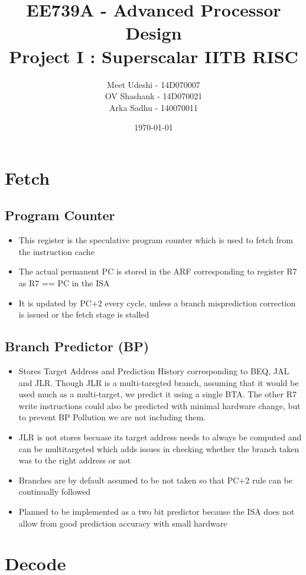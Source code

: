 \documentclass{article}
\title{EE739A - Advanced Processor Design\\
  Project I : Superscalar IITB RISC
}
\author{Meet Udeshi - 14D070007\\
  OV Shashank - 14D070021\\
  Arka Sadhu - 140070011\\
}
\date{\today}
\begin{document}
\maketitle

\section{Fetch}
\subsection{Program Counter}
\begin{itemize}
\item This register is the speculative program counter which is used to fetch from the instruction cache
\item The actual permanent PC is stored in the ARF corresponding to register R7 as R7 == PC in the ISA
\item It is updated by PC+2 every cycle, unless a branch misprediction correction is issued or the fetch stage is stalled
\end{itemize}
\subsection{Branch Predictor (BP)}
\begin{itemize}
\item Stores Target Address and Prediction History corresponding to BEQ, JAL and JLR. Though JLR is a multi-taregted branch, assuming that it would be used much as a multi-target, we predict it using a single BTA. The other R7 write instructions could also be predicted with minimal hardware change, but to prevent BP Pollution we are not including them.
\item JLR is not stores becuase its target address needs to always be computed and can be multitargeted which adds issues in checking whether the branch taken was to the right address or not
\item Branches are by default assumed to be not taken so that PC+2 rule can be continually followed
\item Planned to be implemented as a two bit predictor because the ISA does not allow from good prediction accuracy with small hardware
\end{itemize}

\section{Decode}
\end{document}
